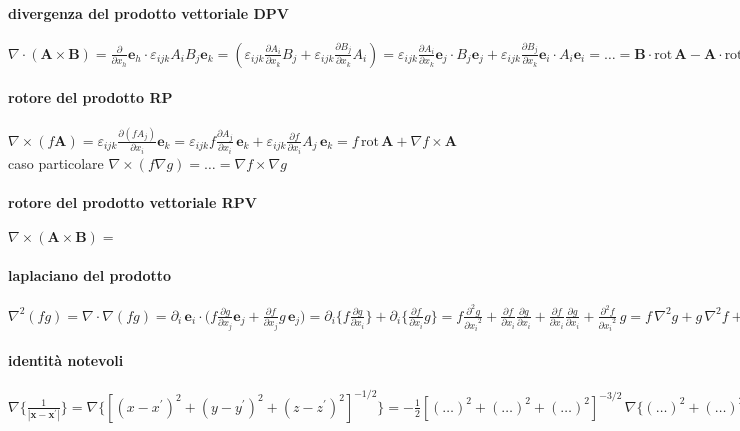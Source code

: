 \documentclass[10pt,a4paper]{article}
\newcommand{\fracp}[2]{\frac{\partial #1}{\partial #2}}
\newcommand{\fracpq}[2]{\frac{\partial^2 #1}{{\partial #2}^2}}
\newcommand{\rot}[1]{\text{rot}\,#1}
\begin{document}
\paragraph{divergenza del prodotto vettoriale DPV} $\nabla \cdot (\mathbf A \times \mathbf B) = \fracp{}{x_h} \mathbf e_h \cdot \varepsilon_{ijk} A_iB_j \mathbf e_k = 
(\varepsilon_{ijk}\fracp{A_i}{x_k}B_j + \varepsilon_{ijk}\fracp{B_j}{x_k}A_i) = \varepsilon_{ijk}\fracp{A_i}{x_k}\mathbf e_j\cdot B_j\mathbf e_j + \varepsilon_{ijk}\fracp{B_j}{x_k}\mathbf e_i\cdot A_i\mathbf e_i = \ldots = \mathbf B \cdot \rot \mathbf A - \mathbf A \cdot \rot \mathbf B$

\paragraph{rotore del prodotto RP} $\nabla \times (f \mathbf A) = \varepsilon_{ijk} \fracp{(f A_j)}{x_i} \mathbf e_k = \varepsilon_{ijk} f \fracp{A_j}{x_i}\, \mathbf e_k + \varepsilon_{ijk} \fracp{f}{x_i} A_j\, \mathbf e_k = f\, \rot{\mathbf A} + \nabla f \times \mathbf A$\\
caso particolare $\nabla \times (f \nabla g) = \ldots = \nabla f \times \nabla g$ 

\paragraph{rotore del prodotto vettoriale RPV} $\nabla \times (\mathbf A \times \mathbf B) = $

\paragraph{laplaciano del prodotto} $\nabla^2 (f g) = \nabla \cdot \nabla(f g) = \partial_i\, \mathbf e_i \cdot \big( f \fracp{g}{x_j} \mathbf e_j + \fracp{f}{x_j} g\, \mathbf e_j \big) = \partial_i \{f \fracp{g}{x_i}\} + \partial_i \{\fracp{f}{x_i} g\} = f \fracpq{g}{x_i} + \fracp{f}{x_i}\fracp{g}{x_i} + \fracp{f}{x_i}\fracp{g}{x_i} + \fracpq{f}{x_i}\, g = f\, \nabla^2 g + g\, \nabla^2 f + 2 \nabla f \cdot \nabla g$

\paragraph{identità notevoli} $\nabla\{\frac1{|\mathbf x - \mathbf x^\prime|}\} = \nabla \{[(x-x^\prime)^2 + (y-y^\prime)^2 + (z-z^\prime)^2]^{-1/2}\} = -\frac12 [(\ldots)^2 + (\ldots)^2 + (\ldots)^2]^{-3/2} \, \nabla\{(\ldots)^2 + (\ldots)^2 + (\ldots)^2\} = -\frac{(\mathbf x - \mathbf x^\prime)}{|\mathbf x - \mathbf x^\prime|^3}$
\end{document}
